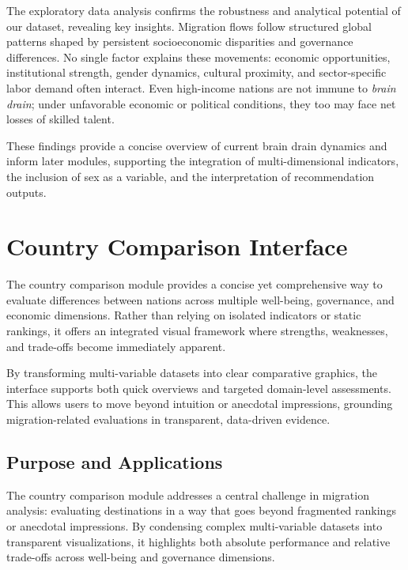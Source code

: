 \documentclass[11pt]{article}
\begin{document}
\noindent
The exploratory data analysis confirms the robustness and analytical potential of our dataset, revealing key insights.  
Migration flows follow structured global patterns shaped by persistent socioeconomic disparities and governance differences.  
No single factor explains these movements: economic opportunities, institutional strength, gender dynamics, cultural proximity, and sector-specific labor demand often interact.  
Even high-income nations are not immune to \textit{brain drain}; under unfavorable economic or political conditions, they too may face net losses of skilled talent.

\noindent
These findings provide a concise overview of current brain drain dynamics and inform later modules, supporting the integration of multi-dimensional indicators, the inclusion of sex as a variable, and the interpretation of recommendation outputs.


\newpage


\section{Country Comparison Interface}

\noindent
The country comparison module provides a concise yet comprehensive way to evaluate differences between nations across multiple well-being, governance, and economic dimensions.  
Rather than relying on isolated indicators or static rankings, it offers an integrated visual framework where strengths, weaknesses, and trade-offs become immediately apparent.

\medskip
\noindent
By transforming multi-variable datasets into clear comparative graphics, the interface supports both quick overviews and targeted domain-level assessments. This allows users to move beyond intuition or anecdotal impressions, grounding migration-related evaluations in transparent, data-driven evidence.


\subsection{Purpose and Applications}

The country comparison module addresses a central challenge in migration analysis: evaluating destinations in a way that goes beyond fragmented rankings or anecdotal impressions. By condensing complex multi-variable datasets into transparent visualizations, it highlights both absolute performance and relative trade-offs across well-being and governance dimensions.  
\end{document}
